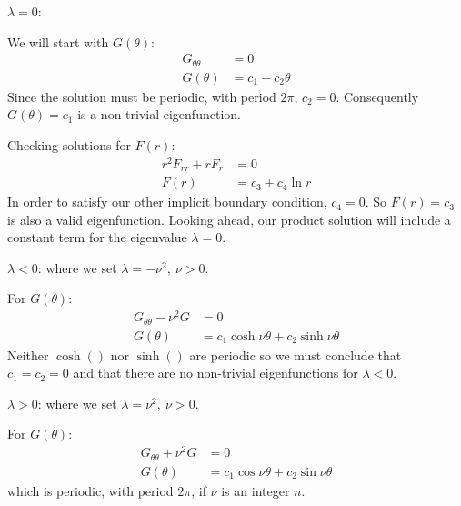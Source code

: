 \vspace{0.15cm}

\noindent\underline{$\lambda = 0$}:

\vspace{0.1cm}

\noindent We will start with $G(\theta)$:
\begin{align*}
G_{\theta \theta} &= 0 \\
G(\theta) &= c_1 + c_2\theta
\end{align*}
Since the solution must be periodic, with period $2\pi$, $c_2 = 0$.  Consequently $G(\theta) = c_1$ is a non-trivial eigenfunction.

Checking solutions for $F(r)$:
\begin{align*}
r^2F_{rr} + rF_{r} &= 0 \\
F(r) &= c_3 + c_4 \ln{r}
\end{align*}
In order to satisfy our other implicit boundary condition, $c_4 = 0$.  So $F(r)=  c_3$ is also a valid eigenfunction.  Looking ahead, our product solution will include a constant term for the eigenvalue $\lambda = 0$.

\vspace{0.15cm}

\noindent\underline{$\lambda < 0$}: where we set $\lambda = -\nu^2, \ \nu>0$.

For $G(\theta)$:
\begin{align*}
G_{\theta \theta} - \nu^2 G &= 0 \\
G(\theta) &= c_1 \cosh{\nu \theta} + c_2 \sinh{\nu \theta}
\end{align*}
Neither $\cosh{()}$ nor $\sinh{()}$ are periodic so we must conclude that $c_1 = c_2 = 0$ and that there are no non-trivial eigenfunctions for $\lambda < 0$.


\vspace{0.15cm}

\noindent\underline{$\lambda > 0$}: where we set $\lambda = \nu^2, \ \nu>0$.

For $G(\theta)$:
\begin{align*}
G_{\theta \theta} + \nu^2 G &= 0 \\
G(\theta) &= c_1 \cos{\nu \theta} + c_2 \sin{\nu \theta}
\end{align*}
which is periodic, with period $2\pi$, if $\nu$ is an integer $n$.

